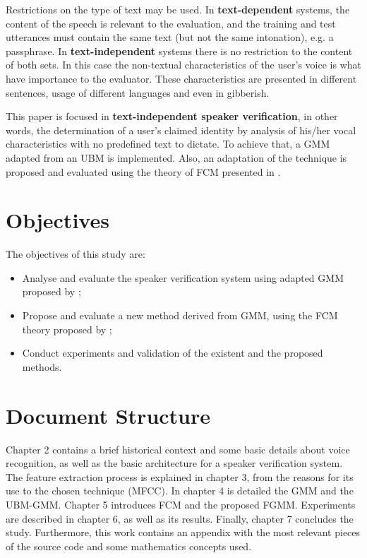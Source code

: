 Restrictions on the type of text may be used. In \textbf{text-dependent} systems, the content of the speech is relevant to the evaluation, and the training and test utterances must contain the same text (but not the same intonation), e.g. a passphrase. In \textbf{text-independent} systems there is no restriction to the content of both sets. In this case the non-textual characteristics of the user's voice is what have importance to the evaluator. These characteristics are presented in different sentences, usage of different languages and even in gibberish.

This paper is focused in \textbf{text-independent speaker verification}, in other words, the determination of a user's claimed identity by analysis of his/her vocal characteristics with no predefined text to dictate. To achieve that, a GMM adapted from an UBM \autocite{reynolds.quatieri.dunn.2000} is implemented. Also, an adaptation of the technique is proposed and evaluated using the theory of FCM presented in \autocite{gao.zhou.pu.2013}.

\section{Objectives}

The objectives of this study are:

\begin{itemize}\itemsep0pt
    \item Analyse and evaluate the speaker verification system using adapted GMM proposed by \autocite{reynolds.quatieri.dunn.2000};
    \item Propose and evaluate a new method derived from GMM, using the FCM theory proposed by \autocite{gao.zhou.pu.2013};
    \item Conduct experiments and validation of the existent and the proposed methods.
\end{itemize}

\section{Document Structure}

Chapter 2 contains a brief historical context and some basic details about voice recognition, as well as the basic architecture for a speaker verification system. The feature extraction process is explained in chapter 3, from the reasons for its use to the chosen technique (MFCC). In chapter 4 is detailed the GMM and the UBM-GMM. Chapter 5 introduces FCM and the proposed FGMM. Experiments are described in chapter 6, as well as its results. Finally, chapter 7 concludes the study. Furthermore, this work contains an appendix with the most relevant pieces of the source code and some mathematics concepts used.